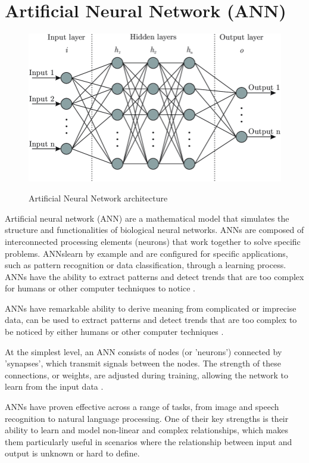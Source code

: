 \section{Artificial Neural Network (ANN)}
\begin{figure}[h]
    \centering
    \includegraphics[scale=0.4]{images/literature review/ANN.png}
    \caption{Artificial Neural Network architecture}
    \label{fig:ANN}
    \parencite{Bre2017}
\end{figure}
Artificial neural network (ANN) are a mathematical model that simulates the structure and functionalities of biological neural networks. ANNs are composed of interconnected processing elements (neurons) that work together to solve specific problems. ANNslearn by example and are configured for specific applications, such as pattern recognition or data classification, through a learning process. ANNs have the ability to extract patterns and detect trends that are too complex for humans or other computer techniques to notice \parencite{Krenker2011}.

ANNs have remarkable ability to derive meaning from complicated or imprecise data, can be used to extract patterns and detect trends that are too complex to be noticed by either humans or other computer techniques \parencite{Zakaria2014ArtificialNN}.

At the simplest level, an ANN consists of nodes (or 'neurons') connected by 'synapses', which transmit signals between the nodes. The strength of these connections, or weights, are adjusted during training, allowing the network to learn from the input data \parencite{Sonali2014ResearchPO}.

ANNs have proven effective across a range of tasks, from image and speech recognition to natural language processing. One of their key strengths is their ability to learn and model non-linear and complex relationships, which makes them particularly useful in scenarios where the relationship between input and output is unknown or hard to define. 

